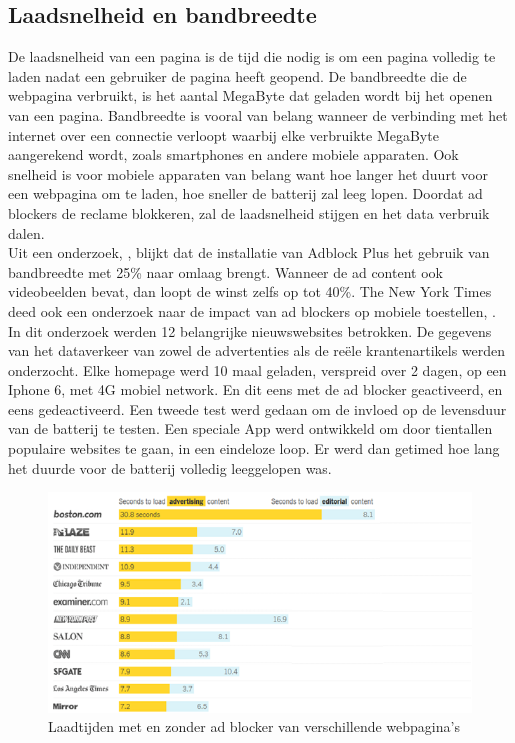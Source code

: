 \documentclass[pdftex,a4paper,12pt,twoside]{report}
\begin{document}
\subsection{Laadsnelheid en bandbreedte}
\label{sec Laadsnelheid en bandbreedte}
De laadsnelheid van een pagina is de tijd die nodig is om een pagina volledig te laden nadat een gebruiker de pagina heeft geopend. De bandbreedte die de webpagina verbruikt, is het aantal MegaByte dat geladen wordt bij het openen van een pagina. Bandbreedte is vooral van belang wanneer de verbinding met het internet over een connectie verloopt waarbij elke verbruikte MegaByte aangerekend wordt, zoals smartphones en andere mobiele apparaten. Ook snelheid is voor mobiele apparaten van belang want hoe langer het duurt voor een webpagina om te laden, hoe sneller de batterij zal leeg lopen. Doordat ad blockers de reclame blokkeren, zal de laadsnelheid stijgen en het data verbruik dalen.
\\
Uit een onderzoek, \cite{Fraser2015}, blijkt dat de installatie van Adblock Plus het gebruik van bandbreedte met 25\% naar omlaag brengt. Wanneer de ad content ook videobeelden bevat, dan loopt de winst zelfs op tot 40\%.
The New York Times deed ook een onderzoek naar de impact van ad blockers op mobiele toestellen, \cite{nytimes2015}.
In dit onderzoek werden 12 belangrijke nieuwswebsites betrokken. De gegevens van het dataverkeer van zowel de advertenties als de reële krantenartikels werden onderzocht. Elke homepage werd 10 maal geladen, verspreid over 2 dagen, op een Iphone 6, met 4G mobiel network. En dit eens met de ad blocker geactiveerd, en eens gedeactiveerd. Een tweede test werd gedaan om de invloed op de levensduur van de batterij te testen. Een speciale App werd ontwikkeld om door tientallen populaire websites te gaan, in een eindeloze loop. Er werd dan getimed hoe lang het duurde voor de batterij volledig leeggelopen was.

\begin{figure}[h!]
\centering
\includegraphics[width=12cm]{img/LoadTimes}
\caption{Laadtijden met en zonder ad blocker van verschillende webpagina's}
\label{fig: LoadTimes}
\end{figure}
\end{document}
